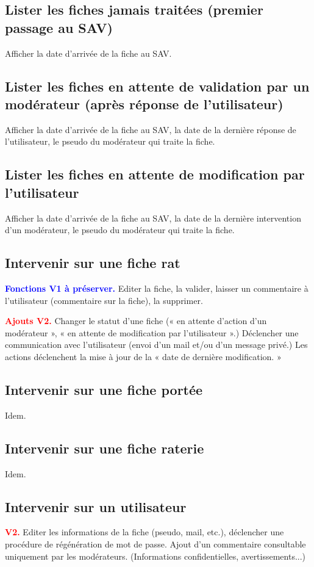 \documentclass[a4paper,10pt]{article}
\newcommand\existant[1]{\noindent\textbf{\textcolor{blue}{#1}}}
\newcommand\desire[1]{\noindent\textbf{\textcolor{red}{#1}}}
\begin{document}
\subsection{Lister les fiches jamais traitées (premier passage au SAV)}
Afficher la date d'arrivée de la fiche au SAV.

\subsection{Lister les fiches en attente de validation par un modérateur (après réponse de l'utilisateur)}
Afficher la date d'arrivée de la fiche au SAV, la date de la dernière réponse de l'utilisateur, le pseudo du modérateur qui traite la fiche.

\subsection{Lister les fiches en attente de modification par l'utilisateur}
Afficher la date d'arrivée de la fiche au SAV, la date de la dernière intervention d'un modérateur, le pseudo du modérateur qui traite la fiche.

\subsection{Intervenir sur une fiche rat}
\existant{Fonctions V1 à préserver.} Editer la fiche, la valider, laisser un commentaire à l'utilisateur (commentaire sur la fiche), la supprimer.

\desire{Ajouts V2.} Changer le statut d'une fiche (« en attente d'action d'un modérateur », « en attente de modification par l'utilisateur ».) Déclencher une communication avec l'utilisateur (envoi d'un mail et/ou d'un message privé.) Les actions déclenchent la mise à jour de la « date de dernière modification. »   

\subsection{Intervenir sur une fiche portée}
Idem.

\subsection{Intervenir sur une fiche raterie}
Idem.

\subsection{Intervenir sur un utilisateur}
\desire{V2.} Editer les informations de la fiche (pseudo, mail, etc.), déclencher une procédure de régénération de mot de passe. Ajout d'un commentaire consultable uniquement par les modérateurs. (Informations confidentielles, avertissements...)
\end{document}
